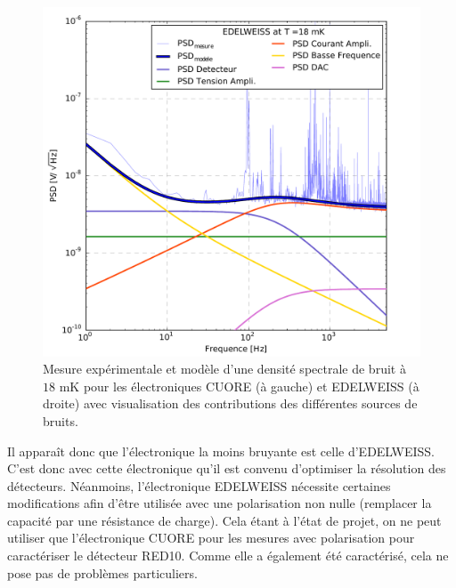 \begin{figure}[!ht]
\begin{minipage}{0.49\textwidth}
\includegraphics[width=\textwidth]{Images/edel_18.pdf}
\end{minipage}
\caption{Mesure expérimentale et modèle d'une densité spectrale de bruit à $18$ mK pour les électroniques CUORE (à gauche) et EDELWEISS (à droite) avec visualisation des contributions des différentes sources de bruits.}
\label{noise-sources}
\end{figure}

Il apparaît donc que l'électronique la moins bruyante est celle d'EDELWEISS. C'est donc avec cette électronique qu'il est convenu d'optimiser la résolution des détecteurs. Néanmoins, l'électronique EDELWEISS nécessite certaines modifications afin d'être utilisée avec une polarisation non nulle (remplacer la capacité par une résistance de charge). Cela étant à l'état de projet, on ne peut utiliser que l'électronique CUORE pour les mesures avec polarisation pour caractériser le détecteur RED10. Comme elle a également été caractérisé, cela ne pose pas de problèmes particuliers.

